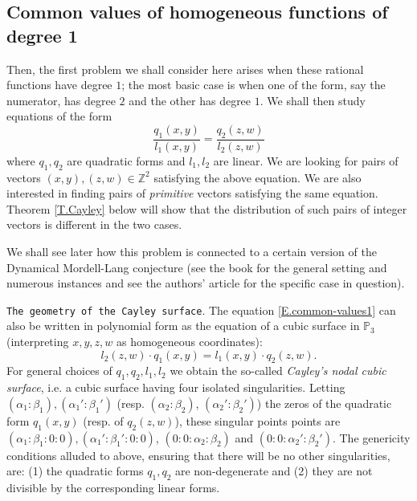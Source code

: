 \documentclass[leqno,12pt]{article} %
\def\Z{{{\mathbb Z}}}
\def\P{{{\mathbb P}}}
\theoremstyle{plain} %
\theoremstyle{definition} %
\begin{document}
\subsection{Common values of homogeneous functions of degree 1}


Then,  the first  problem we shall consider here arises when these rational functions have degree $1$; the most basic case is when  one of the form, say the numerator, has degree $2$ and the other has degree $1$. We shall then study equations of the form
\begin{equation}\label{E.common-values1}
\frac{q_1(x,y)}{l_1(x,y)}=\frac{q_2(z,w)}{l_2(z,w)}
\end{equation}
where $q_1,q_2$ are quadratic forms and $l_1,l_2$ are linear. We are looking for  pairs of vectors $(x,y),(z,w)\in\Z^2$ satisfying the above equation. We are also interested in finding pairs of {\it primitive} vectors satisfying the same equation. Theorem \ref{T.Cayley} below  will show that the distribution of such pairs of integer vectors is different in the two cases. 

We shall  see later how this problem is connected to  a certain version of the Dynamical Mordell-Lang conjecture (see the book \cite{BGT} for the general setting and numerous instances and see the  authors' article \cite{CZbilliards} for the specific case in question). 

\medskip

{\tt The geometry of the Cayley surface}. The equation \eqref{E.common-values1} can also be written in polynomial form as the equation of a cubic surface in $\P_3$ (interpreting $x,y,z,w$ as homogeneous coordinates):
\begin{equation}\label{E.Cayley}
l_2(z,w)\cdot q_1(x,y)=l_1(x,y)\cdot q_2(z,w).
\end{equation}
For general choices of $q_1,q_2,l_1,l_2$ we obtain the so-called {\it Cayley's nodal cubic surface}, i.e. a cubic surface having four isolated singularities. Letting $(\alpha_1:\beta_1), (\alpha_1':\beta_1')$ (resp. $(\alpha_2:\beta_2)$, $(\alpha_2':\beta_2')$) the zeros of the quadratic form $q_1(x,y)$ (resp. of $q_2(z,w)$), these singular points points are $(\alpha_1:\beta_1:0:0),  (\alpha_1':\beta_1':0:0)$, $(0:0:\alpha_2:\beta_2)$ and $(0:0:\alpha_2':\beta_2')$. The genericity conditions alluded to above, ensuring that there will be no other singularities, are: (1) the quadratic forms $q_1,q_2$ are non-degenerate and (2) they are not divisible by the corresponding linear forms. 
\end{document}

